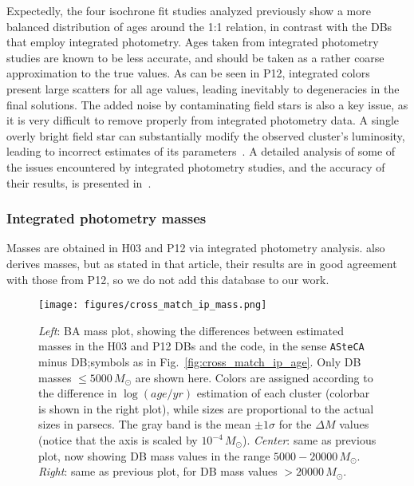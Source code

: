 \documentclass{aa}
\begin{document}
Expectedly, the four isochrone fit studies analyzed previously show a more
balanced distribution of ages around the 1:1 relation, in contrast with the DBs
that employ integrated photometry.
%
Ages taken from integrated photometry studies are known to be less
accurate, and should be taken as a rather coarse approximation to the true
values.
As can be seen in P12, integrated colors present large scatters for
all age values, leading inevitably to degeneracies in the final solutions.
The added noise by contaminating field stars is also a key issue, as it is
very difficult to remove properly from integrated photometry data. A
single overly bright field star can substantially modify the observed
cluster's luminosity, leading to incorrect estimates of its
parameters~\citep{Baumgardt_2013,Piatti_2014_B88}.
A detailed analysis of some of the issues encountered by integrated photometry
studies, and the accuracy of their results, is presented
in~\cite{Anders_2013}.



\subsubsection{Integrated photometry masses}
\label{sssec:integ_photom_masses}
%
%
%
%
Masses are obtained in H03 and P12 via integrated photometry analysis.
\cite{Baumgardt_2013} also derives masses, but as stated in that article, their
results are in good agreement with those from P12, so we do not add this
database to our work.

\begin{figure*}
\texttt{[image: figures/cross\_match\_ip\_mass.png]}
\caption{\emph{Left}: BA mass plot, showing the differences between estimated
masses in the H03 and P12 DBs and the code, in the sense \texttt{ASteCA} minus
DB;\@ symbols as in Fig.~\ref{fig:cross_match_ip_age}.
Only DB masses ${\le}5000\,M_{\odot}$ are shown here.
Colors are assigned according to the difference in $\log(age/yr)$ estimation of
each cluster (colorbar is shown in the right plot), while sizes are proportional to
the actual sizes in parsecs. The gray band is the mean $\pm 1\sigma$ for the
$\Delta M$ values (notice that the axis is scaled by $10^{-4}\,M_{\odot}$).
\emph{Center}: same as previous plot, now showing DB mass values in the range
$5000-20000\,M_{\odot}$.
\emph{Right}: same as previous plot, for DB mass values ${>}20000\,M_{\odot}$.
}
\label{fig:cross_match_ip_mass}
\end{figure*}
\end{document}
